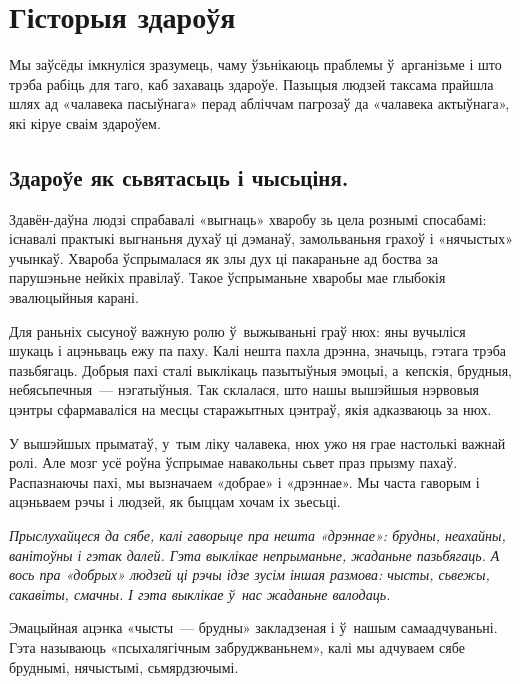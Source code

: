 \section{Гісторыя здароўя}

Мы заўсёды імкнуліся зразумець, чаму ўзьнікаюць праблемы ў~арганізьме і што трэба рабіць для таго, каб захаваць здароўе. Пазыцыя людзей таксама прайшла шлях ад «чалавека пасыўнага» перад абліччам пагрозаў да «чалавека актыўнага», які кіруе сваім здароўем.

\subsection*{Здароўе як сьвятасьць і чысьціня.}

Здавён-даўна людзі спрабавалі «выгнаць» хваробу зь цела рознымі спосабамі: існавалі практыкі выгнаньня духаў ці дэманаў, замольваньня грахоў і «нячыстых» учынкаў. Хвароба ўспрымалася як злы дух ці пакараньне ад боства за парушэньне нейкіх правілаў. Такое ўспрыманьне хваробы мае глыбокія эвалюцыйныя карані.

Для раньніх сысуноў важную ролю ў~выжываньні граў нюх: яны вучыліся шукаць і ацэньваць ежу па паху. Калі нешта пахла дрэнна, значыць, гэтага трэба пазьбягаць. Добрыя пахі сталі выклікаць пазытыўныя эмоцыі, а~кепскія, брудныя, небясьпечныя~--- нэгатыўныя. Так склалася, што нашы вышэйшыя нэрвовыя цэнтры сфармаваліся на месцы старажытных цэнтраў, якія адказваюць за нюх.

У вышэйшых прыматаў, у~тым ліку чалавека, нюх ужо ня грае настолькі важнай ролі. Але мозг усё роўна ўспрымае навакольны сьвет праз прызму пахаў. Распазнаючы пахі, мы вызначаем «добрае» і «дрэннае». Мы часта гаворым і ацэньваем рэчы і людзей, як быццам хочам іх зьесьці.

\emph{Прыслухайцеся да сябе, калі гаворыце пра нешта «дрэннае»: брудны, неахайны, ванітоўны і гэтак далей. Гэта выклікае непрыманьне, жаданьне пазьбягаць. А вось пра «добрых» людзей ці рэчы ідзе зусім іншая размова: чысты, сьвежы, сакавіты, смачны. І гэта выклікае ў~нас жаданьне валодаць.} 

Эмацыйная ацэнка «чысты~--- брудны» закладзеная і ў~нашым самаадчуваньні. Гэта называюць «псыхалягічным забруджваньнем», калі мы адчуваем сябе бруднымі, нячыстымі, сьмярдзючымі.


